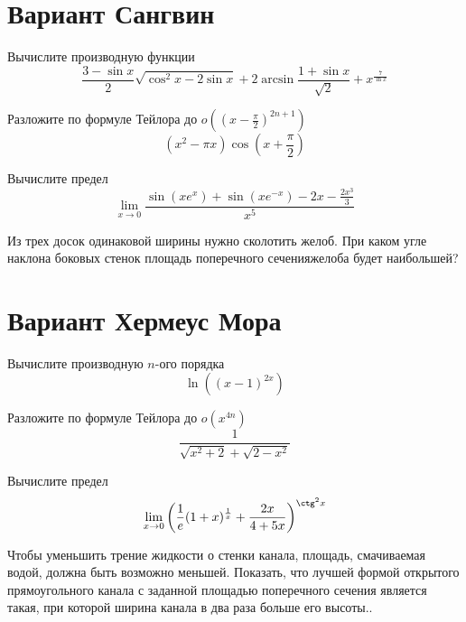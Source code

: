 \documentclass[russian]{article}
\begin{document}
\section*{Вариант Сангвин}

Вычислите производную функции
$$\frac{3 - \sin x}{2}\sqrt{\cos^2 x - 2 \sin x} + 2\arcsin \frac{1 + \sin x}{\sqrt{2}} + x^\frac{7}{\ln x}$$

Разложите по формуле Тейлора до $o((x - \frac{\pi}{2})^{2n + 1})$
$$(x^2 - \pi x) \cos\left(x + \frac{\pi}{2}\right)$$

Вычислите предел
$$\lim_{x \to 0}\frac{\sin(xe^x) + \sin (xe^{-x}) - 2x - \frac{2x^3}{3}}{x^5}$$

Из трех досок одинаковой ширины нужно сколотить желоб. При каком угле наклона боковых стенок площадь поперечного сеченияжелоба будет наибольшей?

\vspace{1cm}
\begin{center}
\end{center}
\newpage

\section*{Вариант Хермеус Мора}

Вычислите производную $n$-ого порядка
$$\ln \left((x - 1)^{2x}\right)$$

Разложите по формуле Тейлора до $o(x^{4n})$
$$\frac{1}{\sqrt{x^2 + 2} + \sqrt{2 - x^2}}$$

Вычислите предел
$$\lim_{x \to 0} \left(\frac{1}{e}(1 + x)^{\frac{1}{x}} + \frac{2x}{4 + 5x}\right)^{\ctg^2 x} $$

Чтобы уменьшить трение жидкости о стенки канала, площадь, смачиваемая водой, должна быть возможно меньшей. Показать, что лучшей формой открытого прямоугольного канала с заданной площадью поперечного сечения является такая, при которой ширина канала в два раза больше его высоты..
\end{document}
